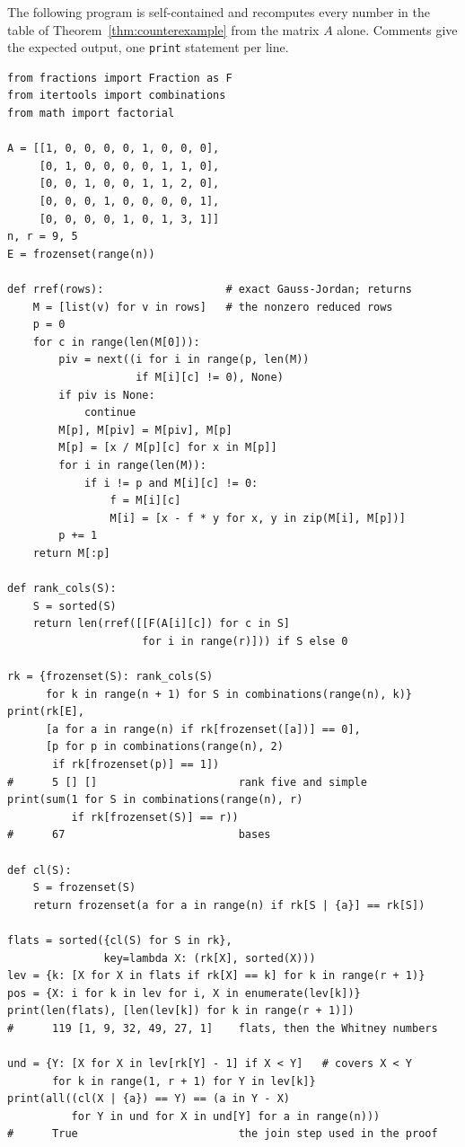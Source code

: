 \documentclass[11pt]{amsart}
\theoremstyle{remark}
\begin{document}
The following program is self-contained and recomputes every number in the
table of Theorem~\ref{thm:counterexample} from the matrix $A$ alone.
Comments give the expected output, one \texttt{print} statement per line.

{\small
\begin{verbatim}
from fractions import Fraction as F
from itertools import combinations
from math import factorial

A = [[1, 0, 0, 0, 0, 1, 0, 0, 0],
     [0, 1, 0, 0, 0, 0, 1, 1, 0],
     [0, 0, 1, 0, 0, 1, 1, 2, 0],
     [0, 0, 0, 1, 0, 0, 0, 0, 1],
     [0, 0, 0, 0, 1, 0, 1, 3, 1]]
n, r = 9, 5
E = frozenset(range(n))

def rref(rows):                   # exact Gauss-Jordan; returns
    M = [list(v) for v in rows]   # the nonzero reduced rows
    p = 0
    for c in range(len(M[0])):
        piv = next((i for i in range(p, len(M))
                    if M[i][c] != 0), None)
        if piv is None:
            continue
        M[p], M[piv] = M[piv], M[p]
        M[p] = [x / M[p][c] for x in M[p]]
        for i in range(len(M)):
            if i != p and M[i][c] != 0:
                f = M[i][c]
                M[i] = [x - f * y for x, y in zip(M[i], M[p])]
        p += 1
    return M[:p]

def rank_cols(S):
    S = sorted(S)
    return len(rref([[F(A[i][c]) for c in S]
                     for i in range(r)])) if S else 0

rk = {frozenset(S): rank_cols(S)
      for k in range(n + 1) for S in combinations(range(n), k)}
print(rk[E],
      [a for a in range(n) if rk[frozenset([a])] == 0],
      [p for p in combinations(range(n), 2)
       if rk[frozenset(p)] == 1])
#      5 [] []                      rank five and simple
print(sum(1 for S in combinations(range(n), r)
          if rk[frozenset(S)] == r))
#      67                           bases

def cl(S):
    S = frozenset(S)
    return frozenset(a for a in range(n) if rk[S | {a}] == rk[S])

flats = sorted({cl(S) for S in rk},
               key=lambda X: (rk[X], sorted(X)))
lev = {k: [X for X in flats if rk[X] == k] for k in range(r + 1)}
pos = {X: i for k in lev for i, X in enumerate(lev[k])}
print(len(flats), [len(lev[k]) for k in range(r + 1)])
#      119 [1, 9, 32, 49, 27, 1]    flats, then the Whitney numbers

und = {Y: [X for X in lev[rk[Y] - 1] if X < Y]   # covers X < Y
       for k in range(1, r + 1) for Y in lev[k]}
print(all((cl(X | {a}) == Y) == (a in Y - X)
          for Y in und for X in und[Y] for a in range(n)))
#      True                         the join step used in the proof


\end{verbatim}}
\end{document}
